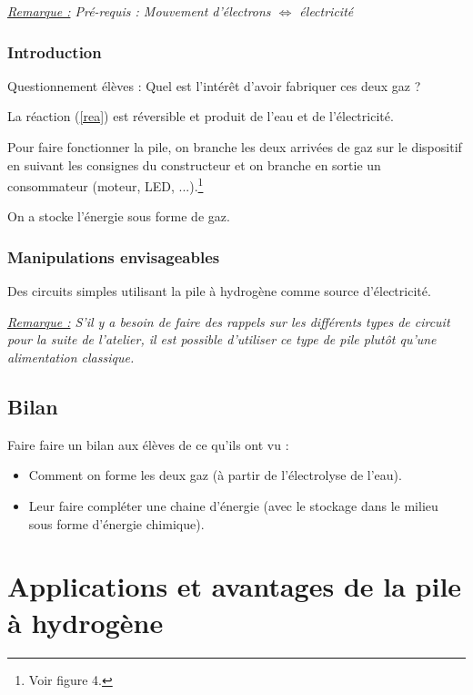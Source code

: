 \documentclass[a4paper, 11pt, twoside]{article}
\numberwithin{equation}{subsection}
\newcommand{\rem}[1]{\textit{\underline{Remarque :} #1}}
\begin{document}
	\rem{Pré-requis : Mouvement d'électrons $\Leftrightarrow$ électricité}
	
	\subsubsection{Introduction}
	
	Questionnement élèves : Quel est l'intérêt d'avoir fabriquer ces deux gaz ?
	
	La réaction (\ref{rea}) est réversible et produit de l'eau et de l'électricité.
	
	Pour faire fonctionner la pile, on branche les deux arrivées de gaz sur le dispositif en suivant les consignes du constructeur et on branche en sortie un consommateur (moteur, LED, ...).\footnote{Voir figure 4.}	
	
	On a stocke l'énergie sous forme de gaz.
	
	\subsubsection{Manipulations envisageables}
	
	Des circuits simples utilisant la pile à hydrogène comme source d'électricité. 
	
	\rem{S'il y a besoin de faire des rappels sur les différents types de circuit pour la suite de l'atelier, il est possible d'utiliser ce type de pile plutôt qu'une alimentation classique.}
	
	\subsection{Bilan}
	
	Faire faire un bilan aux élèves de ce qu'ils ont vu :
	\begin{itemize}	
	\item Comment on forme les deux gaz (à partir de l'électrolyse de l'eau).
	
	\item Leur faire compléter une chaine d'énergie (avec le stockage dans le milieu sous forme d'énergie chimique).
	\end{itemize}
	
	\newpage
	\section{Applications et avantages de la pile à hydrogène}
	
\end{document}
